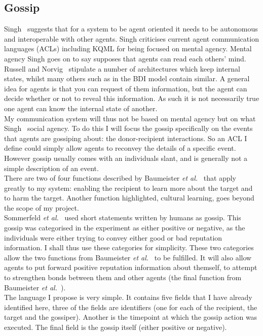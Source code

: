 \documentclass[]{final_report}
\begin{document}
\subsection{Gossip}
\label{subs:gossip}
Singh~\cite{singh1998agent} suggests that for a system to be agent oriented it needs to be autonomous and interoperable with other agents. Singh criticises current agent communication languages (ACLs) including KQML for being focused on mental agency. Mental agency Singh goes on to say supposes that agents can read each others' mind.\\
Russell and Norvig~\cite{russell2016artificial} stipulate a number of architectures which keep internal states, whilst many others such as in the BDI model contain similar. A general idea for agents is that you can request of them information, but the agent can decide whether or not to reveal this information. As such it is not necessarily true one agent can know the internal state of another.\\
My communication system will thus not be based on mental agency but on what Singh~\cite{singh1998agent} social agency. To do this I will focus the gossip specifically on the events that agents are gossiping about: the donor-recipient interactions. So an ACL I define could simply allow agents to reconvey the details of a specific event. However gossip usually comes with an individuals slant, and is generally not a simple description of an event.\\
There are two of four functions described by Baumeister \textit{et al.}~\cite{baumeister2004gossip} that apply greatly to my system: enabling the recipient to learn more about the target and to harm the target. Another function highlighted, cultural learning, goes beyond the scope of my project.\\
Sommerfeld \textit{et al.}~\cite{gossip_alt} used short statements written by humans as gossip. This gossip was categorised in the experiment as either positive or negative, as the individuals were either trying to convey either good or bad reputation information. I shall thus use these categories for simplicity. These two categories allow the two functions from Baumeister \textit{et al.}~\cite{baumeister2004gossip} to be fulfilled. It will also allow agents to put forward positive reputation information about themself, to attempt to strengthen bonds between them and other agents (the final function from Baumeister \textit{et al.}~\cite{baumeister2004gossip}).\\
The language I propose is very simple. It contains five fields that I have already identified here, three of the fields are identifiers (one for each of the recipient, the target and the gossiper). Another is the timepoint at which the gossip action was executed. The final field is the gossip itself (either positive or negative).\\
\end{document}
